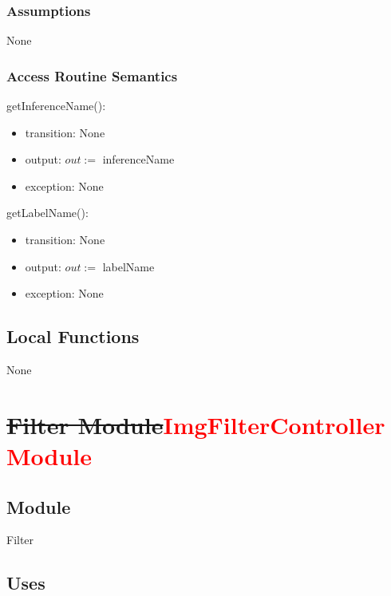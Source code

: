 \documentclass[12pt, titlepage]{article}
\begin{document}
\subsubsection* {Assumptions}

None

\subsubsection* {Access Routine Semantics}

\noindent getInferenceName():
\begin{itemize}
\item transition: None\\
\item output: $out := $ inferenceName\\
\item exception: None\\

\end{itemize}

\noindent getLabelName():
\begin{itemize}
\item transition: None\\
\item output: $out := $ labelName\\
\item exception: None\\

\end{itemize}

\subsection*{Local Functions}

None

\medskip
\medskip


\newpage

\section* {\sout{Filter Module}\textcolor{red}{ImgFilterController Module}}

\subsection*{Module}

Filter

\subsection* {Uses}
\end{document}
